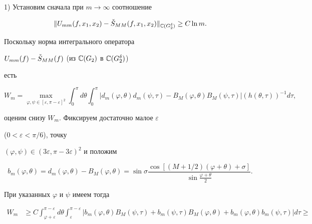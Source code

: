 \begin{pf} 1) Установим сначала при $m\to\infty$ соотношение 


\begin{equation} 


\|U_{mm}(f,x_1,x_2)- 


\Check S_{MM}(f,x_1,x_2)\|_{\Bbb C(G^\delta_2)}\ge 


C\ln m. 


\end{equation} 


Поскольку норма интегрального оператора 


$U_{mm}(f)-\Check S_{MM}(f)$ (из $\Bbb C(G_2)$ в $\Bbb C(G^\delta_2)$) 


есть 


$$ 


W_m=\max_{\varphi,\psi\in[\varepsilon,\pi-\varepsilon]^2} 


\int^\pi_0 d\theta\int^\pi_0 


|d_m(\varphi,\theta)d_m(\psi,\tau)-B_M(\varphi,\theta) 


B_M(\psi,\tau)|(h(\theta,\tau))^{-1}d\tau, 


$$ 


оценим снизу $W_m$. Фиксируем достаточно малое $\varepsilon$ 


($0<\varepsilon<\pi/6$), точку 


$(\varphi,\psi)\in(3\varepsilon,\pi-3\varepsilon)^2$ и положим 


\begin{equation} 


b_m(\varphi,\theta)=d_m(\varphi,\theta)- 


B_M(\varphi,\theta)=\sin\sigma 


\frac{\cos[(M+1/2)(\varphi+\theta)+\sigma]} 


{\sin\frac{\varphi+\theta}{2}}. 


\end{equation} 


При указанных $\varphi$ и $\psi$ имеем тогда 


\begin{align*} 


W_m&\ge C\int^{\pi-\varepsilon}_{\varphi+\varepsilon} 


d\theta\int^{\pi-\varepsilon}_\varepsilon 


|b_m(\varphi,\theta)B_M(\psi,\tau)+ 


b_m(\psi,\tau)B_M(\varphi,\theta)+ 


b_m(\varphi,\theta)b_m(\psi,\tau)|d\tau\ge \\ 



\end{align*}
\end{pf}
